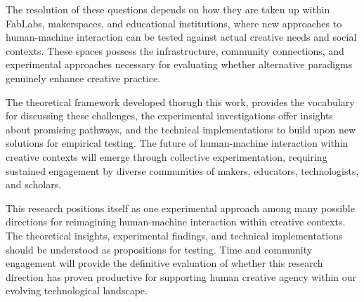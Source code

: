 The resolution of these questions depends on how they are taken up within FabLabs, makerspaces, and educational institutions, where new approaches to human-machine interaction can be tested against actual creative needs and social contexts. These spaces possess the infrastructure, community connections, and experimental approaches necessary for evaluating whether alternative paradigms genuinely enhance creative practice.

\vspace{0.5cm}

The theoretical framework developed thorugh this work, provides the vocabulary for discussing these challenges, the experimental investigations offer insights about promising pathways, and the technical implementations to build upon new solutions for empirical testing. The future of human-machine interaction within creative contexts will emerge through collective experimentation, requiring sustained engagement by diverse communities of makers, educators, technologists, and scholars.

\vspace{0.5cm}

This research positions itself as one experimental approach among many possible directions for reimagining human-machine interaction within creative contexts. The theoretical insights, experimental findings, and technical implementations should be understood as propositions for testing. Time and community engagement will provide the definitive evaluation of whether this research direction has proven productive for supporting human creative agency within our evolving technological landscape.